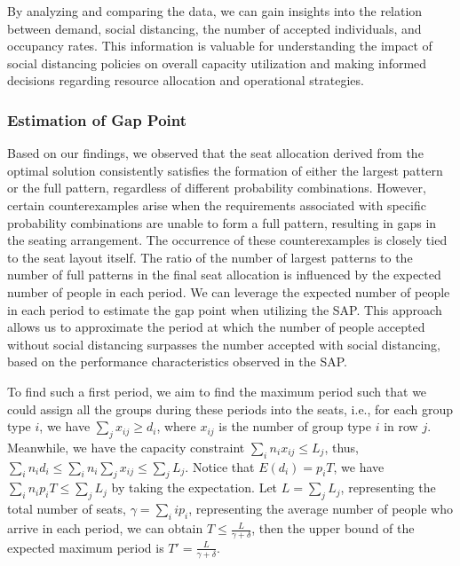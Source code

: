 By analyzing and comparing the data, we can gain insights into the relation between demand, social distancing, the number of accepted individuals, and occupancy rates. This information is valuable for understanding the impact of social distancing policies on overall capacity utilization and making informed decisions regarding resource allocation and operational strategies.

\subsubsection{Estimation of Gap Point}
Based on our findings, we observed that the seat allocation derived from the optimal solution consistently satisfies the formation of either the largest pattern or the full pattern, regardless of different probability combinations. However, certain counterexamples arise when the requirements associated with specific probability combinations are unable to form a full pattern, resulting in gaps in the seating arrangement. The occurrence of these counterexamples is closely tied to the seat layout itself. The ratio of the number of largest patterns to the number of full patterns in the final seat allocation is influenced by the expected number of people in each period. We can leverage the expected number of people in each period to estimate the gap point when utilizing the SAP. This approach allows us to approximate the period at which the number of people accepted without social distancing surpasses the number accepted with social distancing, based on the performance characteristics observed in the SAP.

To find such a first period, we aim to find the maximum period such that we could assign all the groups during these periods into the seats, i.e., for each group type $i$, we have $\sum_{j} x_{ij} \geq d_i$, where $x_{ij}$ is the number of group type $i$ in row $j$. Meanwhile, we have the capacity constraint $\sum_{i} n_{i} x_{ij} \leq L_j$, thus, $\sum_{i} n_i d_i \leq \sum_{i} n_i \sum_{j} x_{ij} \leq \sum_{j} L_{j}$. Notice that $E(d_i) = p_i T$, we have $\sum_{i} n_i p_i T \leq \sum_{j} L_{j}$ by taking the expectation. Let $L = \sum_{j} L_{j}$, representing the total number of seats, $\gamma = \sum_{i} i p_i$, representing the average number of people who arrive in each period, we can obtain $T \leq \frac{L}{\gamma + \delta}$, then the upper bound of the expected maximum period is $T' = \frac{L}{\gamma + \delta}$.

